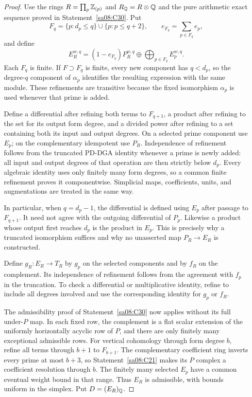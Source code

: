 \begin{proof}
Use the rings $R=\prod_p\mathbb Z_{(p)}$ and $R_\mathbb Q=R\otimes\mathbb Q$
and the pure arithmetic exact sequence proved in
Statement~\ref{sa08:C30}. Put
\[
 F_q=\{p:d_p\leq q\}\cup\{p:p\leq q+2\},
 \qquad e_{F_q}=\sum_{p\in F_q}e_p,
\]
and define
\[
 E_R^{w,q}=(1-e_{F_q})P_R^{w,q}
       \oplus\bigoplus_{p\in F_q}E_p^{w,q}.
\]
Each $F_q$ is finite. If $F\supset F_q$ is finite, every
new component has $q<d_p$, so the degree-$q$ component of
$\alpha_p$ identifies the resulting expression with the
same module. These refinements are transitive because the
fixed isomorphism $\alpha_p$ is used whenever that prime
is added.

Define a differential after refining both terms to $F_{q+1}$,
a product after refining to the set for its output form degree,
and a divided power after refining to a set containing both
its input and output degrees. On a selected prime component
use $E_p$; on the complementary idempotent use $P_R$.
Independence of refinement follows from the truncated
PD-DGA identity whenever a prime is newly added: all input
and output degrees of that operation are then strictly
below $d_p$. Every algebraic identity uses only finitely
many form degrees, so a common finite refinement proves
it componentwise. Simplicial maps, coefficients, units,
and augmentations are treated in the same way.

In particular, when $q=d_p-1$, the differential is defined
using $E_p$ after passage to $F_{q+1}$. It need not agree
with the outgoing differential of $P_p$. Likewise a product
whose output first reaches $d_p$ is the product in $E_p$.
This is precisely why a truncated isomorphism suffices and
why no unasserted map $P_R\to E_R$ is constructed.

Define $g_R:E_R\to T_R$ by $g_p$ on the selected components
and by $f_R$ on the complement. Its independence of
refinement follows from the agreement with $f_p$ in the
truncation. To check a differential or multiplicative
identity, refine to include all degrees involved and use
the corresponding identity for $g_p$ or $f_R$.

The admissibility proof of Statement~\ref{sa08:C30} now
applies without its full under-$P$ map. In each fixed row,
the complement is a flat scalar extension of the uniformly
horizontally acyclic row of $P$, and there are only finitely
many exceptional admissible rows. For vertical cohomology
through form degree $b$, refine all terms through $b+1$
to $F_{b+1}$. The complementary coefficient ring inverts
every prime at most $b+3$, so Statement~\ref{sa08:C21}
makes its $P$ complex a coefficient resolution through $b$.
The finitely many selected $E_p$ have a common eventual
weight bound in that range. Thus $E_R$ is admissible,
with bounds uniform in the simplex. Put $D=(E_R)_\mathbb Q$.


\end{proof}
